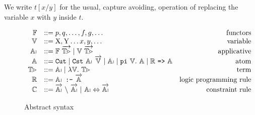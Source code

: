 \documentclass[a4paper, 11pt]{book}
\begin{document}
We write
$t[x/y]$ for the usual, capture avoiding, operation of replacing the variable $x$
with $y$ inside $t$.


\begin{figure}
  $$
  \begin{array}{rlr}
    \PRED & ::= p, q, \ldots, f, g, \ldots & \mathrm{functors}\\
    \VAR & ::= \mathrm{X}, \mathrm{Y} \ldots x, y, \ldots & \mathrm{variable}\\
    \APP & ::= \PRED\ \vecL{\TERM} \mid  \VAR\ \vecL{\TERM} & \mathrm{applicative}\\
    \ATOM& ::= \cut \mid \cst\ \APP\ \vecL{\VAR} \mid \APP \mid \piCmd{\VAR}{\ATOM} \mid \implCmd{{\CLAUSE}}{\ATOM} & \mathrm{atom} \\
    \TERM & ::= \APP \mid \lambda \VAR \bs\ \TERM & \mathrm{term}\\
    \CLAUSE & ::= \clauseCmd{\APP}{\!}{\vecL{\ATOM}} & \mathrm{logic\ programming\ rule}\\
    \CHR & ::= \vecL{\APP}\ \backslash\ \vecL{\APP}\ 
               \mathrm{|}\ \APP \Leftrightarrow  \vecL{\APP} & \mathrm{constraint\ rule}
  \end{array}
  $$
  \caption{Abstract syntax}
  \label{fig:syntax}
\end{figure}

\newenvironment{myRule}[1]{%
  \begin{minipage}{.9\textwidth}
    \centering
    \begin{prooftree}%
      } %
      {
    \end{prooftree}
    \vspace{2pt}
  \end{minipage}
}
\newcommand{\arr}{\ensuremath{\rightsquigarrow}}
\newcommand{\atsign}{\ensuremath{\mbox{\footnotesize\raisebox{-1pt}{\ensuremath{@}}}}}
\makeatletter
\newcommand{\customlabel}[2]{%
  \protected@write \@auxout {}{\string \newlabel {#1}{{\ensuremath{#2}}{\thepage}{#2}{#1}{}} }%
  \hypertarget{#1}{\ensuremath{#2}}
}
\makeatother
\newcommand{\Keyword}[1]{\texttt{{\fontfamily{qcr}\selectfont #1}}}
\end{document}
